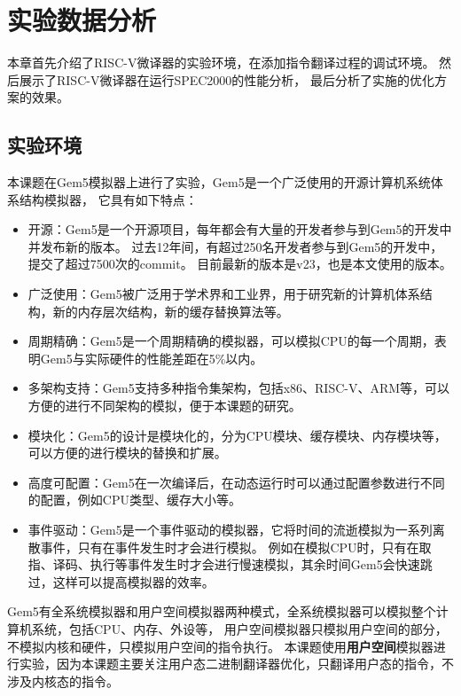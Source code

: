 \chapter{实验数据分析}\label{chap:Epxeriment}

本章首先介绍了RISC-V微译器的实验环境，在添加指令翻译过程的调试环境。
然后展示了RISC-V微译器在运行SPEC2000的性能分析，
最后分析了实施的优化方案的效果。

\section{实验环境}

本课题在Gem5模拟器\cite{gem5OriginalPaper}上进行了实验，Gem5是一个广泛使用的开源计算机系统体系结构模拟器，
它具有如下特点：
\begin{itemize}
  \item 开源：Gem5是一个开源项目，每年都会有大量的开发者参与到Gem5的开发中并发布新的版本。
  过去12年间，有超过250名开发者参与到Gem5的开发中，提交了超过7500次的commit\cite{Gem5SimulatorVersion2020}。
  目前最新的版本是v23，也是本文使用的版本。
  \item 广泛使用：Gem5被广泛用于学术界和工业界，用于研究新的计算机体系结构，新的内存层次结构，新的缓存替换算法等。
  \item 周期精确：Gem5是一个周期精确的模拟器，可以模拟CPU的每一个周期，\cite{Butko2012AccuracyEO}表明Gem5与实际硬件的性能差距在5\%以内。
  \item 多架构支持：Gem5支持多种指令集架构，包括x86、RISC-V、ARM等，可以方便的进行不同架构的模拟，便于本课题的研究。
  \item 模块化：Gem5的设计是模块化的，分为CPU模块、缓存模块、内存模块等，可以方便的进行模块的替换和扩展。
  \item 高度可配置：Gem5在一次编译后，在动态运行时可以通过配置参数进行不同的配置，例如CPU类型、缓存大小等。
  \item 事件驱动：Gem5是一个事件驱动的模拟器，它将时间的流逝模拟为一系列离散事件，只有在事件发生时才会进行模拟。
  例如在模拟CPU时，只有在取指、译码、执行等事件发生时才会进行慢速模拟，其余时间Gem5会快速跳过，这样可以提高模拟器的效率。
\end{itemize}

Gem5有全系统模拟器和用户空间模拟器两种模式，全系统模拟器可以模拟整个计算机系统，包括CPU、内存、外设等，
用户空间模拟器只模拟用户空间的部分，不模拟内核和硬件，只模拟用户空间的指令执行\cite{gem5OriginalPaper}。
本课题使用\textbf{用户空间}模拟器进行实验，因为本课题主要关注用户态二进制翻译器优化，只翻译用户态的指令，不涉及内核态的指令。

